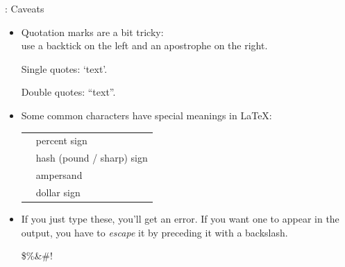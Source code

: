 \documentclass{beamer}
\begin{document}
\begin{frame}[fragile]{\insertsubsection{}: Caveats}
\small
\begin{itemize}
\item Quotation marks are a bit tricky:\\
use a backtick \keystroke{\`{}} on the left and an apostrophe \keystroke{\'{}} on the right.
\begin{exampletwouptiny}
Single quotes: `text'.

Double quotes: ``text''.
\end{exampletwouptiny}

\item Some common characters have special meanings in \LaTeX:\\[1ex]
\begin{tabular}{cl}
\keystrokebftt{\%} & percent sign              \\
\keystrokebftt{\#} & hash (pound / sharp) sign \\
\keystrokebftt{\&} & ampersand                 \\
\keystrokebftt{\$} & dollar sign               \\
\end{tabular}
\item If you just type these, you'll get an error. If you want one to appear in
the output, you have to \emph{escape} it by preceding it with a backslash.
\begin{exampletwoup}
\$\%\&\#!
\end{exampletwoup}
\end{itemize}
\end{frame}
\end{document}
